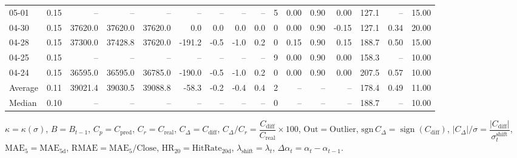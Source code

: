 \begin{threeparttable}
{\begin{tabular}{lrrrrrrrrrrrrrrr}
  05-01 &     0.15 &      -- &      -- &      -- &         -- &             -- &                       -- &                  -- &              5 &       0.00 &      0.90 &           0.00 &            127.1 &              -- &                  15.00 \\
  04-30 &     0.15 & 37620.0 & 37620.0 & 37620.0 &        0.0 &            0.0 &                      0.0 &                 0.0 &              0 &       0.00 &      0.90 &          -0.15 &            127.1 &            0.34 &                  20.00 \\
  04-28 &     0.15 & 37300.0 & 37428.8 & 37620.0 &     -191.2 &           -0.5 &                     -1.0 &                 0.2 &              0 &       0.15 &      0.90 &           0.15 &            188.7 &            0.50 &                  15.00 \\
  04-25 &     0.15 &      -- &      -- &      -- &         -- &             -- &                       -- &                  -- &              9 &       0.00 &      0.90 &           0.00 &            158.3 &              -- &                  10.00 \\
  04-24 &     0.15 & 36595.0 & 36595.0 & 36785.0 &     -190.0 &           -0.5 &                     -1.0 &                 0.2 &              0 &       0.00 &      0.90 &           0.00 &            207.5 &            0.57 &                  10.00 \\
Average &     0.11 & 39021.4 & 39030.5 & 39088.8 &      -58.3 &           -0.2 &                     -0.4 &                 0.4 &              2 &         -- &        -- &             -- &            178.4 &            0.49 &                  11.00 \\
 Median &     0.10 &      -- &      -- &      -- &         -- &             -- &                       -- &                  -- &              0 &         -- &        -- &             -- &            188.7 &              -- &                  10.00 \\
\bottomrule
\end{tabular}
}
\begin{tablenotes}\footnotesize
\item $\kappa=\kappa(\sigma)$, $B=B_{t-1}$, $C_p=C_{\text{pred}}$, $C_r=C_{\text{real}}$, $C_\Delta=C_{\text{diff}}$, $C_\Delta/C_r=\dfrac{C_{\text{diff}}}{C_{\text{real}}}\times100$, $\mathrm{Out}=\text{Outlier}$, $\mathrm{sgn}\,C_\Delta=\operatorname{sign}(C_{\text{diff}})$, $|C_\Delta|/\sigma=\dfrac{|C_{\text{diff}}|}{\sigma_t^{\text{shift}}}$, $\mathrm{MAE}_5=\mathrm{MAE}_{5\text{d}}$, $\mathrm{RMAE}= \mathrm{MAE}_5 / \text{Close}$, $\mathrm{HR}_{20}=\mathrm{HitRate}_{20\text{d}}$, 
$\lambda_{\text{shift}}=\lambda_t$, 
$\Delta\alpha_t=\alpha_t-\alpha_{t-1}$.
\end{tablenotes}
\end{threeparttable}
\endgroup

